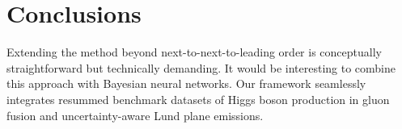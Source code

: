 \section{Conclusions}\label{sec:conclusions}

Extending the method beyond next-to-next-to-leading order is
conceptually straightforward but technically demanding. It would be
interesting to combine this approach with Bayesian neural networks. Our
framework seamlessly integrates resummed benchmark datasets of Higgs
boson production in gluon fusion and uncertainty-aware Lund plane
emissions.

